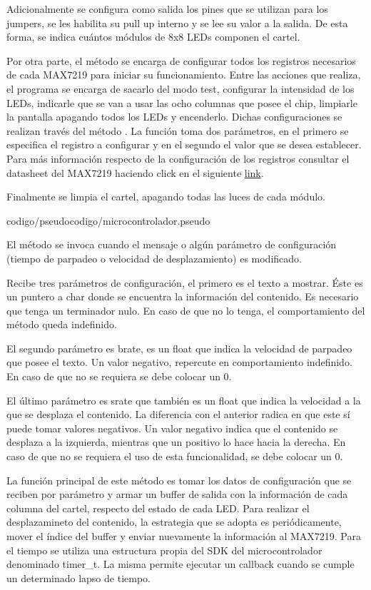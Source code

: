 Adicionalmente se configura como salida los pines que se utilizan para los jumpers, se les habilita su pull up interno y se lee su valor a la salida.
De esta forma, se indica cuántos módulos de 8x8 LEDs componen el cartel.

Por otra parte, el método se encarga de configurar todos los registros necesarios de cada MAX7219 para iniciar su funcionamiento.
Entre las acciones que realiza, el programa se encarga de sacarlo del modo test, configurar la intensidad de los LEDs, indicarle que se van a usar las ocho columnas que posee el chip, limpiarle la pantalla apagando todos los LEDs y encenderlo.
Dichas configuraciones se realizan través del método .
La función toma dos parámetros, en el primero se especifica el registro a configurar y en el segundo el valor que se desea establecer.
Para más información respecto de la configuración de los registros consultar el datasheet del MAX7219 haciendo click en el siguiente \href{https://datasheets.maximintegrated.com/en/ds/MAX7219-MAX7221.pdf}{link}.

Finalmente se limpia el cartel, apagando todas las luces de cada módulo.

 {codigo/pseudocodigo/microcontrolador.pseudo}

El método  se invoca cuando el mensaje o algún parámetro de configuración (tiempo de parpadeo o velocidad de desplazamiento) es modificado.

Recibe tres parámetros de configuración, el primero es el texto a mostrar.
Éste es un puntero a char donde se encuentra la información del contenido.
Es necesario que tenga un terminador nulo.
En caso de que no lo tenga, el comportamiento del método queda indefinido.

El segundo parámetro es brate, es un float que indica la velocidad de parpadeo que posee el texto.
Un valor negativo, repercute en comportamiento indefinido.
En caso de que no se requiera se debe colocar un 0.

El último parámetro es srate que también es un float que indica la velocidad a la que se desplaza el contenido.
La diferencia con el anterior radica en que este sí puede tomar valores negativos.
Un valor negativo indica que el contenido se desplaza a la izquierda, mientras que un positivo lo hace hacia la derecha.
En caso de que no se requiera el uso de esta funcionalidad, se debe colocar un 0. 

La función principal de este método es tomar los datos de configuración que se reciben por parámetro y armar un buffer de salida con la información de cada columna del cartel, respecto del estado de cada LED.
Para realizar el desplazamineto del contenido, la estrategia que se adopta es periódicamente, mover el índice del buffer y enviar nuevamente la información al MAX7219.
Para el tiempo se utiliza una estructura propia del SDK del microcontrolador denominado timer\_t.
La misma permite ejecutar un callback cuando se cumple un determinado lapso de tiempo.

